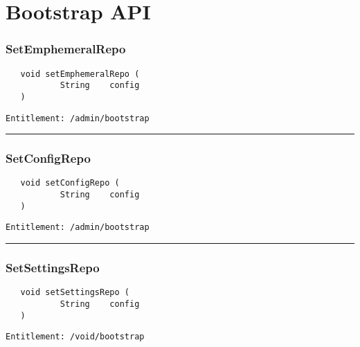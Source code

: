 \chapter{Bootstrap API}

\subsection{SetEmphemeralRepo}
\label{Api:SetEmphemeralRepo}
\begin{verbatim}
   void setEmphemeralRepo (
           String    config
   )
\end{verbatim}
\begin{Verbatim}[fontsize=\small, formatcom=\color{Maroon}]
  Entitlement: /admin/bootstrap
\end{Verbatim}



\rule{12cm}{2pt}
\subsection{SetConfigRepo}
\label{Api:SetConfigRepo}
\begin{verbatim}
   void setConfigRepo (
           String    config
   )
\end{verbatim}
\begin{Verbatim}[fontsize=\small, formatcom=\color{Maroon}]
  Entitlement: /admin/bootstrap
\end{Verbatim}



\rule{12cm}{2pt}
\subsection{SetSettingsRepo}
\label{Api:SetSettingsRepo}
\begin{verbatim}
   void setSettingsRepo (
           String    config
   )
\end{verbatim}
\begin{Verbatim}[fontsize=\small, formatcom=\color{Maroon}]
  Entitlement: /void/bootstrap
\end{Verbatim}



